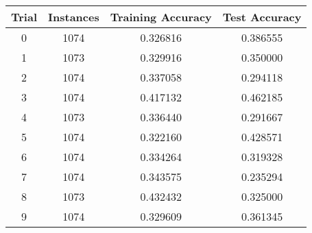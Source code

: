 {\footnotesize
\begin{tabular}{ c | c | c | c }
Trial & Instances & Training Accuracy & Test Accuracy \\
\hline
0 & 1074 & 0.326816 & 0.386555 \\
1 & 1073 & 0.329916 & 0.350000 \\
2 & 1074 & 0.337058 & 0.294118 \\
3 & 1074 & 0.417132 & 0.462185 \\
4 & 1073 & 0.336440 & 0.291667 \\
5 & 1074 & 0.322160 & 0.428571 \\
6 & 1074 & 0.334264 & 0.319328 \\
7 & 1074 & 0.343575 & 0.235294 \\
8 & 1073 & 0.432432 & 0.325000 \\
9 & 1074 & 0.329609 & 0.361345 \\
\end{tabular}
}
